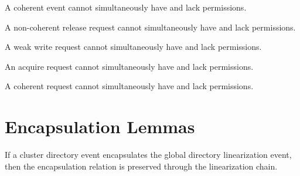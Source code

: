 \begin{lemma}
  \label{lem:contradiction_has_perms_and_no_perms}
  \leanok
  A coherent event cannot simultaneously have and lack permissions.
\end{lemma}

\begin{lemma}
  \label{lem:contradiction_nc_release_perms}
  \leanok
  A non-coherent release request cannot simultaneously
  have and lack permissions.
\end{lemma}

\begin{lemma}
  \label{lem:contradiction_weak_write_perms}
  \leanok
  A weak write request cannot simultaneously have and lack permissions.
\end{lemma}

\begin{lemma}
  \label{lem:contradiction_acquire_perms}
  \leanok
  An acquire request cannot simultaneously have and lack permissions.
\end{lemma}

\begin{lemma}
  \label{lem:contradiction_coherent_perms}
  \leanok
  A coherent request cannot simultaneously have and lack permissions.
\end{lemma}

\section{Encapsulation Lemmas}
\label{sec:cache-request-linearization-encapsulation}

\begin{lemma}
  \label{lem:dir_lin_encap_global_dir_lin}
  \leanok
  If a cluster directory event encapsulates the global directory
  linearization event, then the encapsulation relation is preserved
  through the linearization chain.
\end{lemma}

